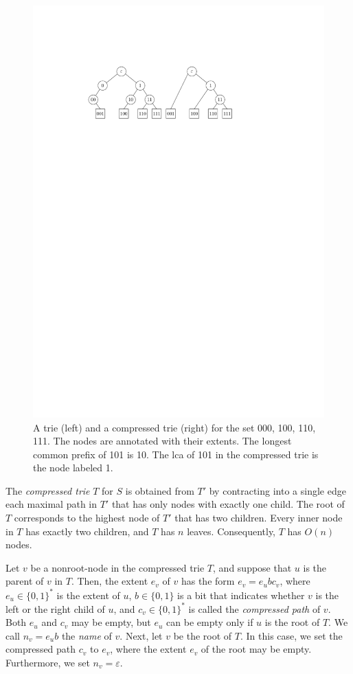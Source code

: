 \documentclass[a4paper,11pt]{article}
\newcommand{\eps}{\varepsilon}
\newcommand{\?}{\mskip1.5mu}
\begin{document}
\begin{figure}
  \centering
  \includegraphics{trie}
  \caption{A trie (left) and a compressed trie (right) for the set 
  000, 100, 110, 111. The nodes are annotated with their
  extents. The longest common prefix of 101 is  10. The 
  lca of 101 in the compressed trie
    is the node labeled 1.}
  \label{fig:trie}
\end{figure}

The \emph{compressed trie} $T$ for $S$ is obtained
from $T'$ by contracting into a single edge each maximal path in $T'$ that
has only nodes with exactly one child.
The root of $T$ corresponds to the highest node of $T'$ that has 
two children.  Every inner node in $T$ has exactly two children,
and $T$ has $n$ leaves. 
Consequently, $T$ has $O(n)$ nodes. 

Let $v$ be a nonroot-node in the compressed trie $T$,
and suppose that $u$ is the parent of $v$ in $T$. Then, 
the extent $e_v$ of $v$ has the form $e_v = e_ubc_v$, 
where $e_u \in \{0, 1\}^*$ is the extent of $u$, $b \in \{0,1\}$ is 
a bit that indicates whether $v$ is the left or the right child
of $u$, and $c_v \in \{0, 1\}^*$ is called the \emph{compressed
path} of $v$. Both $e_u$ and $c_v$ may be empty, but $e_u$
can be empty only if $u$ is the root of $T$. 
We call $n_v = e_ub$ the \emph{name} of $v$.
Next, let $v$ be the root of $T$.
In this case, we set the compressed path $c_v$
to $e_v$, where the extent $e_v$ of the root may
be empty.
Furthermore, we set $n_v = \eps$.
\end{document}
